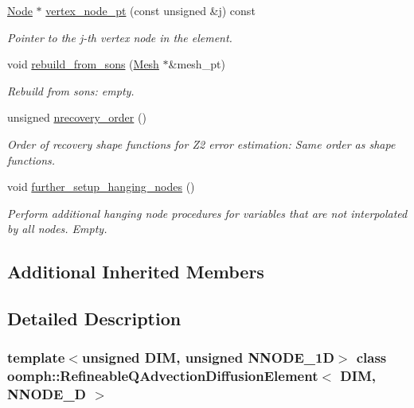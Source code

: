 \begin{DoxyCompactItemize}
\hyperlink{classoomph_1_1Node}{Node} $\ast$ \hyperlink{classoomph_1_1RefineableQAdvectionDiffusionElement_aa685343ba8291d44838c3791c846e27a}{vertex\+\_\+node\+\_\+pt} (const unsigned \&j) const
\begin{DoxyCompactList}\small\item\em Pointer to the j-\/th vertex node in the element. \end{DoxyCompactList}\item 
void \hyperlink{classoomph_1_1RefineableQAdvectionDiffusionElement_ad2a59ed27f0ef1509a797a4ad97121c9}{rebuild\+\_\+from\+\_\+sons} (\hyperlink{classoomph_1_1Mesh}{Mesh} $\ast$\&mesh\+\_\+pt)
\begin{DoxyCompactList}\small\item\em Rebuild from sons\+: empty. \end{DoxyCompactList}\item 
unsigned \hyperlink{classoomph_1_1RefineableQAdvectionDiffusionElement_abd5f23d9c5da2bcd579ee279422891f4}{nrecovery\+\_\+order} ()
\begin{DoxyCompactList}\small\item\em Order of recovery shape functions for Z2 error estimation\+: Same order as shape functions. \end{DoxyCompactList}\item 
void \hyperlink{classoomph_1_1RefineableQAdvectionDiffusionElement_ab82fcbe9afa3da1e40a7152c2ef19a27}{further\+\_\+setup\+\_\+hanging\+\_\+nodes} ()
\begin{DoxyCompactList}\small\item\em Perform additional hanging node procedures for variables that are not interpolated by all nodes. Empty. \end{DoxyCompactList}\end{DoxyCompactItemize}
\subsection*{Additional Inherited Members}


\subsection{Detailed Description}
\subsubsection*{template$<$unsigned D\+IM, unsigned N\+N\+O\+D\+E\+\_\+1D$>$\newline
class oomph\+::\+Refineable\+Q\+Advection\+Diffusion\+Element$<$ D\+I\+M, N\+N\+O\+D\+E\+\_\+D $>$}

